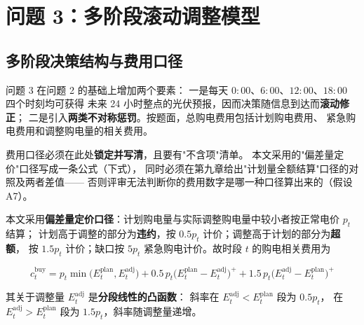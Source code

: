 
\section{问题 3：多阶段滚动调整模型}

\subsection{多阶段决策结构与费用口径}

问题 3 在问题 2 的基础上增加两个要素：
一是每天 \(0{:}00\)、\(6{:}00\)、\(12{:}00\)、\(18{:}00\) 四个时刻均可获得
未来 24 小时整点的光伏预报，因而决策随信息到达而\textbf{滚动修正}；
二是引入\textbf{两类不对称惩罚}。按题面，总购电费用包括计划购电费用、
紧急购电费用和调整购电量的相关费用。

\begin{guideblock}
费用口径必须在此处\textbf{锁定并写清}，且要有"不含项"清单。
本文采用的"偏差量定价"口径写成一条公式（下式），
同时必须在第九章给出"计划量全额结算"口径的对照及两者差值——
否则评审无法判断你的费用数字是哪一种口径算出来的（假设 A7）。
\end{guideblock}

本文采用\textbf{偏差量定价口径}：计划购电量与实际调整购电量中较小者按正常电价 \(p_t\) 结算；
计划高于调整的部分为\textbf{违约}，按 \(0.5p_t\) 计价；调整高于计划的部分为\textbf{超额}，
按 \(1.5p_t\) 计价；缺口按 \(5p_t\) 紧急购电计价。故时段 \(t\) 的购电相关费用为

\begin{equation}
  c_t^{\text{buy}}
  =p_t\min\bigl(E^{\text{plan}}_t,E^{\text{adj}}_t\bigr)
  +0.5\,p_t\bigl(E^{\text{plan}}_t-E^{\text{adj}}_t\bigr)^{+}
  +1.5\,p_t\bigl(E^{\text{adj}}_t-E^{\text{plan}}_t\bigr)^{+}
  \label{eq:q3-cost}
\end{equation}

其关于调整量 \(E^{\text{adj}}_t\) 是\textbf{分段线性的凸函数}：
斜率在 \(E^{\text{adj}}_t<E^{\text{plan}}_t\) 段为 \(0.5p_t\)，
在 \(E^{\text{adj}}_t>E^{\text{plan}}_t\) 段为 \(1.5p_t\)，斜率随调整量递增。

